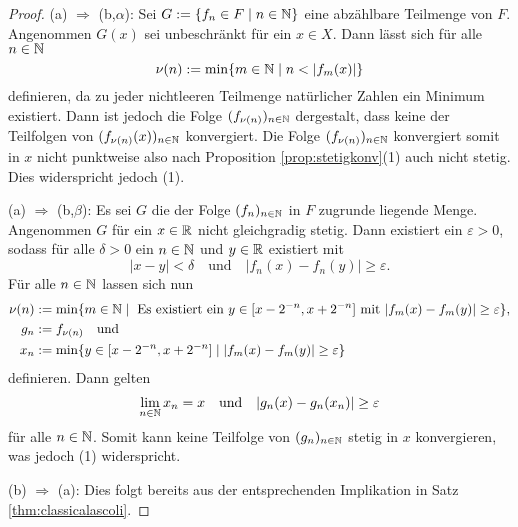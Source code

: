 \begin{proof}
  (a) $\Rightarrow$ (b,$\alpha$):
  Sei $G := \{f_n \in F \mid n \in \mathbb{N}\}$ eine abzählbare Teilmenge von $F$.
  Angenommen $G(x)$ sei unbeschränkt für ein $x \in X$.
  Dann lässt sich für alle $n \in \mathbb{N}$
  \begin{displaymath}
    \nu(n) := \min \{ m \in \mathbb{N} \mid n < |f_m(x)| \}
  \end{displaymath}
  definieren, da zu jeder nichtleeren Teilmenge natürlicher Zahlen ein Minimum existiert.
  Dann ist jedoch die Folge $(f_{\nu(n)})_{n \in \mathbb{N}}$ dergestalt, dass keine der Teilfolgen von $(f_{\nu(n)}(x))_{n \in \mathbb{N}}$ konvergiert.
  Die Folge $(f_{\nu(n)})_{n \in \mathbb{N}}$ konvergiert somit in $x$ nicht punktweise also nach Proposition \ref{prop:stetigkonv}(1) auch nicht stetig.
  Dies widerspricht jedoch (1).

  (a) $\Rightarrow$ (b,$\beta$):
  Es sei $G$ die der Folge $(f_n)_{n \in \mathbb{N}}$ in $F$ zugrunde liegende Menge.
  Angenommen $G$ für ein $x \in \mathbb{R}$ nicht gleichgradig stetig.
  Dann existiert ein $\varepsilon > 0$, sodass für alle $\delta > 0$ ein $n \in \mathbb{N}$ und $y \in \mathbb{R}$ existiert mit
  \begin{displaymath}
     |x - y| < \delta \quad\text{und}\quad |f_n(x) - f_n(y)| \geq \varepsilon.
  \end{displaymath}
  Für alle $n \in \mathbb{N}$ lassen sich nun
  \begin{align*}
    \nu(n) &:= \min \{ m \in \mathbb{N} \mid \text{ Es existiert ein } y \in [x - 2^{-n}, x + 2^{-n}] \text{ mit } |f_m(x) - f_m(y)| \geq \varepsilon\}, \\
    g_n &:= f_{\nu(n)} \quad\text{und}\\
    x_n &:= \min\{ y \in [x - 2^{-n}, x + 2^{-n}] \mid |f_m(x) - f_m(y)| \geq \varepsilon \}
  \end{align*}
  definieren.
  Dann gelten
  \begin{displaymath}
    \lim_{n \in \mathbb{N}} x_n = x \quad\text{und}\quad|g_n(x) - g_n(x_n)| \geq \varepsilon
  \end{displaymath}
  für alle $n \in \mathbb{N}$.
  Somit kann keine Teilfolge von $(g_n)_{n \in \mathbb{N}}$ stetig in $x$ konvergieren, was jedoch (1) widerspricht.

  (b) $\Rightarrow$ (a):
  Dies folgt bereits aus der entsprechenden Implikation in Satz \ref{thm:classicalascoli}.
\end{proof}
